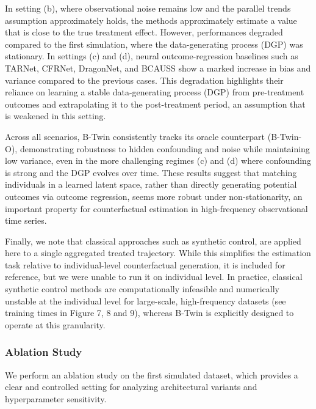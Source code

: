 \documentclass[10pt]{article} %
\begin{document}
In setting (b), where observational noise remains low and the parallel trends assumption approximately holds, the methods approximately estimate a value that is close to the true treatment effect. However, performances degraded compared to the first simulation, where the data-generating process (DGP) was stationary. 
In settings (c) and (d), neural outcome-regression baselines such as TARNet, CFRNet, DragonNet, and BCAUSS show a marked increase in bias and variance compared to the previous cases. This degradation highlights their reliance on learning a stable data-generating process (DGP) from pre-treatment outcomes and extrapolating it to the post-treatment period, an assumption that is weakened in this setting.

Across all scenarios, B-Twin consistently tracks its oracle counterpart (B-Twin-O), demonstrating robustness to hidden confounding and noise while maintaining low variance, even in the more challenging regimes (c) and (d) where confounding is strong and the DGP evolves over time. These results suggest that matching individuals in a learned latent space, rather than directly generating potential outcomes via outcome regression, seems more robust under non-stationarity, an important property for counterfactual estimation in high-frequency observational time series.

Finally, we note that classical approaches such as synthetic control, are applied here to a single aggregated treated trajectory. While this simplifies the estimation task relative to individual-level counterfactual generation, it is included for reference, but we were unable to run it on individual level. In practice, classical synthetic control methods are computationally infeasible and numerically unstable at the individual level for large-scale, high-frequency datasets {(see training times in Figure 7, 8 and 9)}, whereas B-Twin is explicitly designed to operate at this granularity.


\subsubsection{Ablation Study}
We perform an ablation study on the first simulated dataset, which provides a clear and controlled setting for analyzing architectural variants and hyperparameter sensitivity.
\end{document}
